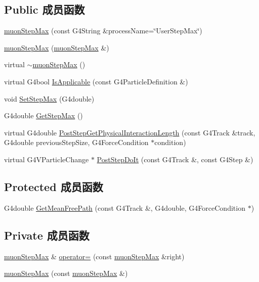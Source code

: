 \subsection*{Public 成员函数}
\begin{DoxyCompactItemize}
\item 
\hyperlink{classmuonStepMax_ae51ff3435957e85c269ef9d327b75482}{muon\+Step\+Max} (const G4\+String \&process\+Name=\char`\"{}User\+Step\+Max\char`\"{})
\item 
\hyperlink{classmuonStepMax_a41ccffbc62f636553f3d9143e98b2079}{muon\+Step\+Max} (\hyperlink{classmuonStepMax}{muon\+Step\+Max} \&)
\item 
virtual \hyperlink{classmuonStepMax_addd063eedac6d8211fba2e9c746df7a1}{$\sim$muon\+Step\+Max} ()
\item 
virtual G4bool \hyperlink{classmuonStepMax_a4437a2282448452a419149cd8d8f7495}{Is\+Applicable} (const G4\+Particle\+Definition \&)
\item 
void \hyperlink{classmuonStepMax_a449cd30e5d5284d56a0dc10bf831e4db}{Set\+Step\+Max} (G4double)
\item 
G4double \hyperlink{classmuonStepMax_adf76383939936db76e310b661b4f332f}{Get\+Step\+Max} ()
\item 
virtual G4double \hyperlink{classmuonStepMax_aea1aeac21f0095b44bedf878789b9d0d}{Post\+Step\+Get\+Physical\+Interaction\+Length} (const G4\+Track \&track, G4double previous\+Step\+Size, G4\+Force\+Condition $\ast$condition)
\item 
virtual G4\+V\+Particle\+Change $\ast$ \hyperlink{classmuonStepMax_af3da1fe21a53518e52fea709a52173fd}{Post\+Step\+Do\+It} (const G4\+Track \&, const G4\+Step \&)
\end{DoxyCompactItemize}
\subsection*{Protected 成员函数}
\begin{DoxyCompactItemize}
\item 
G4double \hyperlink{classmuonStepMax_a792f2c77129ec1eeae9ac56902ec6e90}{Get\+Mean\+Free\+Path} (const G4\+Track \&, G4double, G4\+Force\+Condition $\ast$)
\end{DoxyCompactItemize}
\subsection*{Private 成员函数}
\begin{DoxyCompactItemize}
\item 
\hyperlink{classmuonStepMax}{muon\+Step\+Max} \& \hyperlink{classmuonStepMax_aff00989b733170efdc406178a342a73b}{operator=} (const \hyperlink{classmuonStepMax}{muon\+Step\+Max} \&right)
\item 
\hyperlink{classmuonStepMax_ace6b77563b71db42586959b95acad24e}{muon\+Step\+Max} (const \hyperlink{classmuonStepMax}{muon\+Step\+Max} \&)
\end{DoxyCompactItemize}
